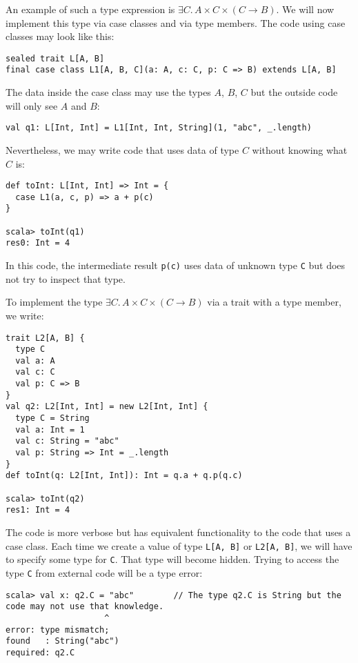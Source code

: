 An example of such a type expression is $\exists C.\,A\times C\times\left(C\rightarrow B\right)$.
We will now implement this type via case classes and via type members.
The code using case classes may look like this:
\begin{lstlisting}
sealed trait L[A, B]
final case class L1[A, B, C](a: A, c: C, p: C => B) extends L[A, B]
\end{lstlisting}
The data inside the case class may use the types $A$, $B$, $C$
but the outside code will only see $A$ and $B$:
\begin{lstlisting}
val q1: L[Int, Int] = L1[Int, Int, String](1, "abc", _.length)
\end{lstlisting}
Nevertheless, we may write code that uses data of type $C$ without
knowing what $C$ is:
\begin{lstlisting}
def toInt: L[Int, Int] => Int = {
  case L1(a, c, p) => a + p(c)
}

scala> toInt(q1)
res0: Int = 4
\end{lstlisting}
In this code, the intermediate result \lstinline!p(c)!
uses data of unknown type \lstinline!C!
but does not try to inspect that type.

To implement the type $\exists C.\,A\times C\times\left(C\rightarrow B\right)$
via a trait with a type member, we write:
\begin{lstlisting}
trait L2[A, B] {
  type C
  val a: A
  val c: C
  val p: C => B
}
val q2: L2[Int, Int] = new L2[Int, Int] {
  type C = String
  val a: Int = 1
  val c: String = "abc"
  val p: String => Int = _.length
}
def toInt(q: L2[Int, Int]): Int = q.a + q.p(q.c)

scala> toInt(q2)
res1: Int = 4
\end{lstlisting}
The code is more verbose but has equivalent functionality to the code
that uses a case class. Each time we create a value of type \lstinline!L[A, B]!
or \lstinline!L2[A, B]!,
we will have to specify some type for \lstinline!C!.
That type will become hidden. Trying to access the type \lstinline!C!
from external code will be a type error:
\begin{lstlisting}
scala> val x: q2.C = "abc"        // The type q2.C is String but the code may not use that knowledge.
                    ^
error: type mismatch;
found   : String("abc")
required: q2.C
\end{lstlisting}

